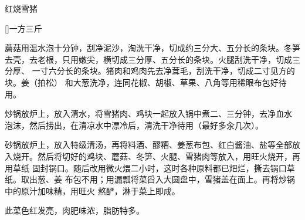 \begin{recipe}{红烧雪猪}

\ingredients

[\footnotemark]{一方三斤}

\preparation

\step 蘑菇用温水泡十分钟，刮净泥沙，淘洗干净，切成约三分大、五分长的条块。冬笋
去壳，去老根，只用嫩尖，横切成三分厚、五分长的条块。火腿刮洗干净，切成三分厚、
一寸六分长的条块。猪肉和鸡肉先去净茸毛，刮洗干净，切成二寸见方的块。姜（拍松）
和大葱洗净，连同花椒、胡椒、草果、八角等用稀眼布包好待用。

\step 炒锅放炉上，放入清水，将雪猪肉、鸡块一起放入锅中煮二、三分钟，去净血水
泡沫，然后捞出，在清凉水中漂冷后，清洗干净待用（最好多汆几次）。

\step 砂锅放炉上，放入特级清汤，再将料酒、醪糟、姜葱布包、红白酱油、盐等全部放
入烧开。然后将切好的鸡块、蘑菇、冬笋、火腿、雪猪肉等放入，用旺火烧开，再用草纸
固封锅口。随后改用微火煨二小时，这时各种原料都已𤆵烂，撕去锅口草纸。取出葱、姜
布包不用；用漏瓢将菜舀入大圆盘中，雪猪盖在面上。再将炒锅中的原汁加味精，用旺火
熬酽，淋于菜上即成。

\features

此菜色红发亮，肉肥味浓，脂肪特多。


\end{recipe}


